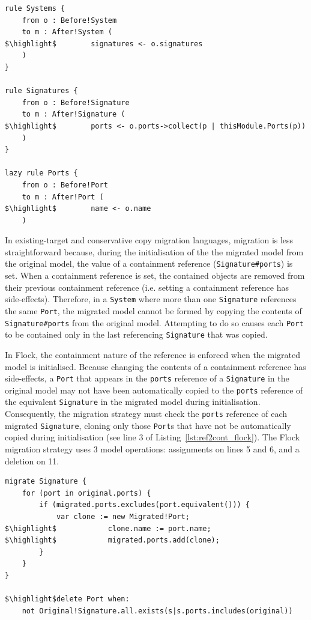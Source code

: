 \begin{lstlisting}[float=tbp, caption= Migration for Change Reference to Containment in ATL, label=lst:ref2cont_atl, language=ATL, tabsize=2]
rule Systems {
	from o : Before!System
	to m : After!System (
$\highlight$		signatures <- o.signatures
	)
}

rule Signatures {
	from o : Before!Signature
	to m : After!Signature (
$\highlight$		ports <- o.ports->collect(p | thisModule.Ports(p))
	)
}

lazy rule Ports {
	from o : Before!Port
	to m : After!Port (
$\highlight$		name <- o.name
	)
\end{lstlisting}

In existing-target and conservative copy migration languages, migration is less straightforward because, during the initialisation of the the migrated model from the original model, the value of a containment reference (\texttt{Si\-gn\-at\-ure\#po\-r\-ts}) is set. When a containment reference is set, the contained objects are removed from their previous containment reference (i.e. setting a containment reference has side-effects). Therefore, in a \texttt{System} where more than one \texttt{Signature} references the same \texttt{Port}, the migrated model cannot be formed by copying the contents of \texttt{Signature\#ports} from the original model. Attempting to do so causes each \texttt{Port} to be contained only in the last referencing \texttt{Signature} that was copied.

In Flock, the containment nature of the reference is enforced when the migrated model is initialised. Because changing the contents of a containment reference has side-effects, a \texttt{Port} that appears in the \texttt{ports} reference of a \texttt{Signature} in the original model may not have been automatically copied to the \texttt{ports} reference of the equivalent \texttt{Signature} in the migrated model during initialisation. Consequently, the migration strategy must check the \texttt{ports} reference of each migrated \texttt{Signature}, cloning only those \texttt{Port}s that have not be automatically copied during initialisation (see line 3 of Listing~\ref{lst:ref2cont_flock}). The Flock migration strategy uses 3 model operations: assignments on lines 5 and 6, and a deletion on 11.

\begin{lstlisting}[float=tbp, caption=Migration for Change Reference to Containment in Flock, label=lst:ref2cont_flock, language=Flock, tabsize=2]
migrate Signature {
	for (port in original.ports) {
		if (migrated.ports.excludes(port.equivalent())) {
			var clone := new Migrated!Port;
$\highlight$			clone.name := port.name;
$\highlight$			migrated.ports.add(clone);
		}
	}
}

$\highlight$delete Port when:
	not Original!Signature.all.exists(s|s.ports.includes(original))
\end{lstlisting}

